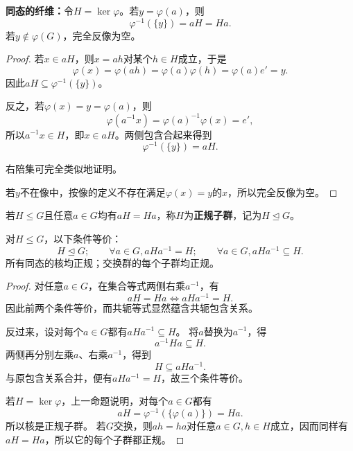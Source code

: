 \begin{proposition}
\textbf{同态的纤维：}令$H=\ker\varphi$。若$y=\varphi(a)$，则
\[
\varphi^{-1}(\{y\})=aH=Ha.
\]
若$y\notin\varphi(G)$，完全反像为空。
\end{proposition}
\begin{proof}
若$x\in aH$，则$x=ah$对某个$h\in H$成立，于是
\[
\varphi(x)=\varphi(ah)=\varphi(a)\varphi(h)=\varphi(a)e'=y.
\]
因此$aH\subseteq\varphi^{-1}(\{y\})$。

反之，若$\varphi(x)=y=\varphi(a)$，则
\[
\varphi(a^{-1}x)=\varphi(a)^{-1}\varphi(x)=e',
\]
所以$a^{-1}x\in H$，即$x\in aH$。两侧包含合起来得到
\[
\varphi^{-1}(\{y\})=aH.
\]

右陪集可完全类似地证明。

若$y$不在像中，按像的定义不存在满足$\varphi(x)=y$的$x$，所以完全反像为空。
\end{proof}

\begin{definition}
若$H\leq G$且任意$a\in G$均有$aH=Ha$，称$H$为\textbf{正规子群}，记为$H\trianglelefteq G$。
\end{definition}

\begin{proposition}
对$H\leq G$，以下条件等价：
\[
H\trianglelefteq G;\qquad
\forall a\in G, aHa^{-1}=H;\qquad
\forall a\in G, aHa^{-1}\subseteq H.
\]
所有同态的核均正规；交换群的每个子群均正规。
\end{proposition}
\begin{proof}
对任意$a\in G$，在集合等式两侧右乘$a^{-1}$，有
\[
aH=Ha\iff aHa^{-1}=H.
\]
因此前两个条件等价，而共轭等式显然蕴含共轭包含关系。

反过来，设对每个$a\in G$都有$aHa^{-1}\subseteq H$。
将$a$替换为$a^{-1}$，得
\[
a^{-1}Ha\subseteq H.
\]
两侧再分别左乘$a$、右乘$a^{-1}$，得到
\[
H\subseteq aHa^{-1}.
\]
与原包含关系合并，便有$aHa^{-1}=H$，故三个条件等价。

若$H=\ker\varphi$，上一命题说明，对每个$a\in G$都有
\[
aH=\varphi^{-1}(\{\varphi(a)\})=Ha.
\]
所以核是正规子群。
若$G$交换，则$ah=ha$对任意$a\in G,h\in H$成立，因而同样有$aH=Ha$，所以它的每个子群都正规。
\end{proof}
